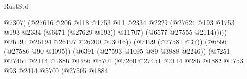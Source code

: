 \begin{lexlean}{RustStd}
\begin{coremodule}
                                                            @7307)
                                                          (@27616
                                                            @206
                                                            @118
                                                            @1753
                                                            @11
                                                            @2334
                                                            @2229
                                                            (@27624
                                                              @193
                                                              @1753
                                                              @193
                                                              @2334
                                                              (@6471 (@27629 @193))
                                                              @11707)
                                                            (@6577 @27555 @2114)))))
                                                    @26191
                                                    @26194
                                                    @26197
                                                    @26200
                                                    @13016))
                                                (@7199 (@27581 @37))
                                                (@6566 (@27586 @90 @1095))
                                                (@6391 (@27593 @1095 @89 @3888 @2246))
                                                (@7251
                                                  @27451
                                                  @2114
                                                  @1886
                                                  @1856
                                                  @5701
                                                  (@7260
                                                    @27451
                                                    @2114
                                                    @286
                                                    @1882
                                                    @1753
                                                    @93
                                                    @2414
                                                    @5700
                                                    (@27505
                                                      @1884

\end{coremodule}
\end{lexlean}
